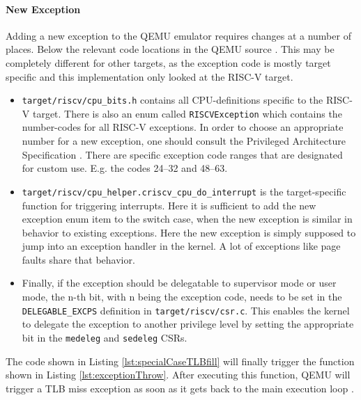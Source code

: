 \paragraph{New Exception} Adding a new exception to the QEMU emulator requires changes at a number of places. Below
the relevant code locations in the QEMU source \cite{QEMUSource2024}.
This may be completely different for other targets, as the exception code is mostly target specific and
this implementation only looked at the RISC-V target.
\begin{itemize}
    \item \texttt{target/riscv/cpu\_bits.h} contains all CPU-definitions specific to the RISC-V target.
          There is also an enum called \texttt{RISCVException} which contains the number-codes for all RISC-V exceptions.
          In order to choose an appropriate number for a new exception, one should consult the Privileged Architecture Specification \cite{RISCVInstructionSet}.
          There are specific exception code ranges that are designated for custom use. E.g. the codes 24--32 and 48--63.
    \item \texttt{target/riscv/cpu\_helper.c\:riscv\_cpu\_do\_interrupt\(\)} is the target-specific function
          for triggering interrupts. Here it is sufficient to add the new exception enum item to the switch case, when
          the new exception is similar in behavior to existing exceptions.
          Here the new exception is simply supposed to jump into an exception handler in the kernel. A lot of exceptions
          like page faults share that behavior.
    \item Finally, if the exception should be delegatable to supervisor mode or user mode, the n-th bit,
          with n being the exception code, needs to be set in the \texttt{DELEGABLE\_EXCPS} definition in \texttt{target/riscv/csr.c}.
          This enables the kernel to delegate the exception to another privilege level by setting the appropriate
          bit in the \texttt{medeleg} and \texttt{sedeleg} CSRs.
\end{itemize}

The code shown in Listing \ref{lst:specialCaseTLBfill} will finally trigger the function shown in
Listing \ref{lst:exceptionThrow}. After executing this function, QEMU will trigger a TLB miss exception as soon
as it gets back to the main execution loop \cite{QEMUSource2024}.

